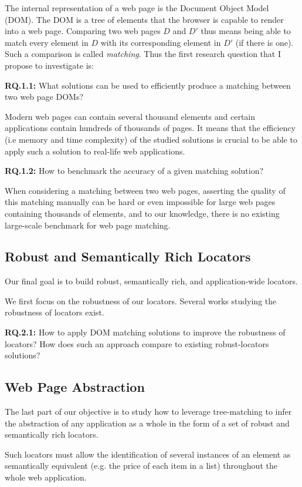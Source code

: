 The internal representation of a web page is the Document Object Model (DOM). The DOM is a tree of elements that the browser is capable to render into a web page.
Comparing two web pages $D$ and $D'$ thus means being able to match every element in $D$ with its corresponding element in $D'$ (if there is one). Such a comparison is called \emph{matching}.
Thus the first research question that I propose to investigate is:

\textbf{RQ.1.1:} What solutions can be used to efficiently produce a matching between two web page DOMs?

Modern web pages can contain several thousand elements and certain applications contain hundreds of thousands of pages. It means that the efficiency (i.e memory and time complexity) of the studied solutions is crucial to be able to apply such a solution to real-life web applications.

\textbf{RQ.1.2:} How to benchmark the accuracy of a given matching solution?

When considering a matching between two web pages, asserting the quality of this matching manually can be hard or even impossible for large web pages containing thousands of elements, and to our knowledge, there is no existing large-scale benchmark for web page matching.

\subsection{Robust and Semantically Rich Locators}
Our final goal is to build robust, semantically rich, and application-wide locators.

We first focus on the robustness of our locators. 
Several works studying the robustness of locators exist.

\textbf{RQ.2.1:} How to apply DOM matching solutions to improve the robustness of locators? How does such an approach compare to existing robust-locators solutions?

\subsection{Web Page Abstraction}
The last part of our objective is to study how to leverage tree-matching to infer the abstraction of any application as a whole in the form of a set of robust and semantically rich locators.

Such locators must allow the identification of several instances of an element as semantically equivalent (e.g. the price of each item in a list) throughout the whole web application.

